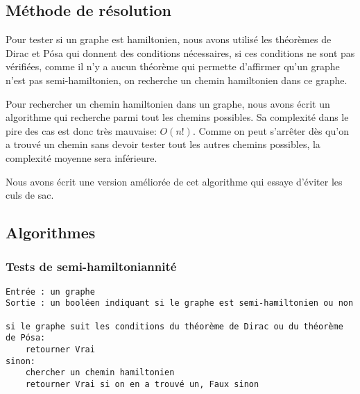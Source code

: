 \documentclass{scrartcl}
\begin{document}
  \subsection{Méthode de résolution}
    Pour tester si un graphe est hamiltonien, nous avons utilisé les théorèmes
    de Dirac et Pósa qui donnent des conditions nécessaires, si ces conditions
    ne sont pas vérifiées, comme il n'y a aucun théorème qui permette
    d'affirmer qu'un graphe n'est pas semi-hamiltonien, on recherche un chemin
    hamiltonien dans ce graphe.

    Pour rechercher un chemin hamiltonien dans un graphe, nous avons écrit un
    algorithme qui recherche parmi tout les chemins possibles. Sa complexité
    dans le pire des cas est donc très mauvaise: $O(n!)$. Comme on peut
    s'arrêter dès qu'on a trouvé un chemin sans devoir tester tout les autres
    chemins possibles, la complexité moyenne sera inférieure.

    Nous avons écrit une version améliorée de cet algorithme qui essaye
    d'éviter les culs de sac.

  \subsection{Algorithmes}
    \subsubsection{Tests de semi-hamiltoniannité}
      \begin{lstlisting}
Entrée : un graphe
Sortie : un booléen indiquant si le graphe est semi-hamiltonien ou non

si le graphe suit les conditions du théorème de Dirac ou du théorème de Pósa:
    retourner Vrai
sinon:
    chercher un chemin hamiltonien
    retourner Vrai si on en a trouvé un, Faux sinon
      \end{lstlisting}
\end{document}
